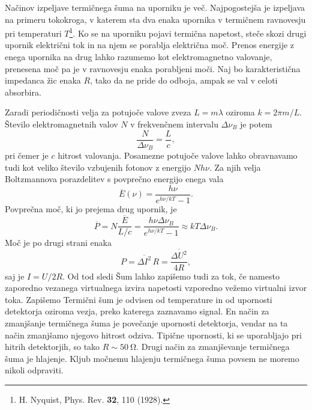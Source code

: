 Načinov izpeljave termičnega šuma na uporniku je več. Najpogostejša 
je izpeljava na primeru tokokroga, v katerem sta dva enaka upornika v termičnem ravnovesju
pri temperaturi $T$\footnote{H. Nyquist, Phys. Rev. {\bf 32}, 110 (1928).}. 
Ko se na uporniku pojavi termična napetost, steče skozi drugi upornik električni 
tok in na njem se porablja električna moč. Prenos energije z enega upornika
na drug lahko razumemo kot elektromagnetno valovanje, prenesena moč pa
je v ravnovesju enaka porabljeni moči. Naj bo karakteristična impedanca
žic enaka $R$, tako da ne pride do odboja, ampak se val v celoti absorbira.

Zaradi periodičnosti velja za potujoče valove zveza $L = m \lambda$
oziroma $k = 2\pi m/L$. Število elektromagnetnih valov $N$ v frekvenčnem intervalu 
$\Delta\nu_B$ je potem 
\begin{equation}
\frac{N}{\Delta\nu_B} = \frac{L}{c},
\end{equation}
pri čemer je $c$ hitrost valovanja. Posamezne potujoče valove lahko obravnavamo
tudi kot veliko število vzbujenih fotonov z energijo $Nh\nu$. Za njih velja Boltzmannova
porazdelitev s povprečno energijo enega vala 
\begin{equation}
\overline{E}(\nu) = \frac{h \nu}{e^{h\nu/kT}-1}.
\end{equation}
Povprečna moč, ki jo prejema drug upornik, je
\begin{equation}
\overline{P} = N \frac{\overline{E}}{L/c}= \frac{h \nu \Delta \nu_B}{e^{h\nu/kT}-1}
\approx kT \Delta \nu_B.
\end{equation}
Moč je po drugi strani enaka
\begin{equation}
P = \overline{\Delta I^2}\,R = \frac{\overline{\Delta U^2}}{4R},
\end{equation}
saj je $I=U/2R$. Od tod sledi
Šum lahko zapišemo tudi za tok, če namesto zaporedno vezanega virtualnega 
izvira napetosti vzporedno vežemo virtualni izvor toka. Zapišemo
Termični šum je odvisen od temperature in od upornosti detektorja oziroma
vezja, preko katerega zaznavamo signal. En način za zmanjšanje termičnega šuma
je povečanje upornosti detektorja, vendar na ta način zmanjšamo njegovo hitrost
odziva. Tipične upornosti, ki se uporabljajo pri hitrih detektorjih, so 
tako $R \sim 50~\si{\ohm}$. Drugi način za zmanjševanje termičnega šuma je
hlajenje. Kljub močnemu hlajenju termičnega šuma povsem ne moremo nikoli odpraviti. 

